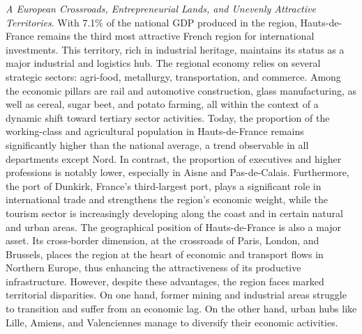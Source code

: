 \begin{refsegment}
\textsl{A European Crossroads, Entrepreneurial Lands, and Unevenly Attractive Territories}. With 7.1\% of the national \acrshort{GDP} produced in the region, Hauts-de-France remains the third most attractive French region for international investments. This territory, rich in industrial heritage, maintains its status as a major industrial and logistics hub. The regional economy relies on several strategic sectors: agri-food, metallurgy, transportation, and commerce. Among the economic pillars are rail and automotive construction, glass manufacturing, as well as cereal, sugar beet, and potato farming, all within the context of a dynamic shift toward tertiary sector activities. Today, the proportion of the working-class and agricultural population in Hauts-de-France remains significantly higher than the national average, a trend observable in all departments except Nord. In contrast, the proportion of executives and higher professions is notably lower, especially in Aisne and Pas-de-Calais. Furthermore, the port of Dunkirk, France’s third-largest port, plays a significant role in international trade and strengthens the region’s economic weight, while the tourism sector is increasingly developing along the coast and in certain natural and urban areas. The geographical position of Hauts-de-France is also a major asset. Its cross-border dimension, at the crossroads of Paris, London, and Brussels, places the region at the heart of economic and transport flows in Northern Europe, thus enhancing the attractiveness of its productive infrastructure. However, despite these advantages, the region faces marked territorial disparities. On one hand, former mining and industrial areas struggle to transition and suffer from an economic lag. On the other hand, urban hubs like Lille, Amiens, and Valenciennes manage to diversify their economic activities.%


\end{refsegment}
